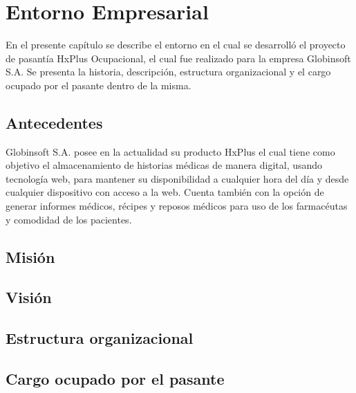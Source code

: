 \chapter{Entorno Empresarial}

En el presente capítulo se describe el entorno en el cual se desarrolló el proyecto de pasantía HxPlus Ocupacional, el cual fue realizado para la empresa Globinsoft S.A. Se presenta la historia, descripción, estructura organizacional y el cargo ocupado por el pasante dentro de la misma.

    \section{Antecedentes}
    Globinsoft S.A. posee en la actualidad su producto HxPlus el cual tiene como objetivo el almacenamiento de historias médicas de manera digital, usando tecnología web, para mantener su disponibilidad a cualquier hora del día y desde cualquier dispositivo con acceso a la web. Cuenta también con la opción de generar informes médicos, récipes y reposos médicos para uso de los farmacéutas y comodidad de los pacientes.
    
    
    \section{Misión}
    \section{Visión}
    \section{Estructura organizacional}
    \section{Cargo ocupado por el pasante}

\pagebreak